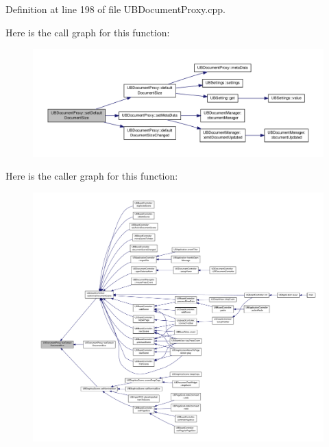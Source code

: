 Definition at line 198 of file U\-B\-Document\-Proxy.\-cpp.



Here is the call graph for this function\-:
\nopagebreak
\begin{figure}[H]
\begin{center}
\leavevmode
\includegraphics[width=350pt]{de/db4/class_u_b_document_proxy_a956c4570c8f97908895dd5169e3a8af1_cgraph}
\end{center}
\end{figure}




Here is the caller graph for this function\-:
\nopagebreak
\begin{figure}[H]
\begin{center}
\leavevmode
\includegraphics[width=350pt]{de/db4/class_u_b_document_proxy_a956c4570c8f97908895dd5169e3a8af1_icgraph}
\end{center}
\end{figure}


